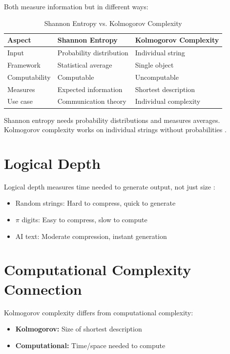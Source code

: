 \documentclass[12pt,a4paper]{report}
\begin{document}
Both measure information but in different ways:

\begin{table}[h]
\centering
\caption{Shannon Entropy vs. Kolmogorov Complexity}
\begin{tabular}{lll}
\toprule
\textbf{Aspect} & \textbf{Shannon Entropy} & \textbf{Kolmogorov Complexity} \\
\midrule
Input & Probability distribution & Individual string \\
Framework & Statistical average & Single object \\
Computability & Computable & Uncomputable \\
Measures & Expected information & Shortest description \\
Use case & Communication theory & Individual complexity \\
\bottomrule
\end{tabular}
\end{table}

Shannon entropy needs probability distributions and measures averages. Kolmogorov complexity works on individual strings without probabilities \cite{li2008introduction}.

\section{Logical Depth}

Logical depth measures time needed to generate output, not just size \cite{bennett1988logical}:
\begin{itemize}
    \item Random strings: Hard to compress, quick to generate
    \item $\pi$ digits: Easy to compress, slow to compute
    \item AI text: Moderate compression, instant generation
\end{itemize}

\section{Computational Complexity Connection}

Kolmogorov complexity differs from computational complexity:
\begin{itemize}
    \item \textbf{Kolmogorov:} Size of shortest description
    \item \textbf{Computational:} Time/space needed to compute
\end{itemize}
\end{document}
